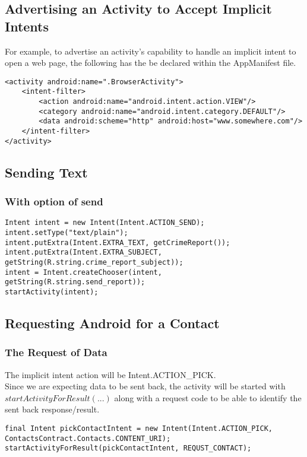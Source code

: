 \documentclass[]{article}
\begin{document}
\subsection{Advertising an Activity to Accept Implicit Intents}
For example, to advertise an activity's capability to handle an implicit intent to open a web page, the following has the be declared within the AppManifest file.
\begin{lstlisting}
<activity android:name=".BrowserActivity">
	<intent-filter>
		<action android:name="android.intent.action.VIEW"/>
		<category android:name="android.intent.category.DEFAULT"/>
		<data android:scheme="http" android:host="www.somewhere.com"/>
	</intent-filter>
</activity>
\end{lstlisting}

\subsection{Sending Text}
\subsubsection{With option of send}
\begin{lstlisting}
Intent intent = new Intent(Intent.ACTION_SEND);
intent.setType("text/plain");
intent.putExtra(Intent.EXTRA_TEXT, getCrimeReport());
intent.putExtra(Intent.EXTRA_SUBJECT, getString(R.string.crime_report_subject));
intent = Intent.createChooser(intent, getString(R.string.send_report));
startActivity(intent);
\end{lstlisting}

\subsection{Requesting Android for a Contact}
\subsubsection{The Request of Data}
The implicit intent action will be Intent.ACTION\_PICK.
\\
Since we are expecting data to be sent back, the activity will be started with $startActivityForResult(...)$ along with a request code to be able to identify the sent back response/result.
\begin{lstlisting}
final Intent pickContactIntent = new Intent(Intent.ACTION_PICK, ContactsContract.Contacts.CONTENT_URI);
startActivityForResult(pickContactIntent, REQUST_CONTACT);
\end{lstlisting}
\end{document}
